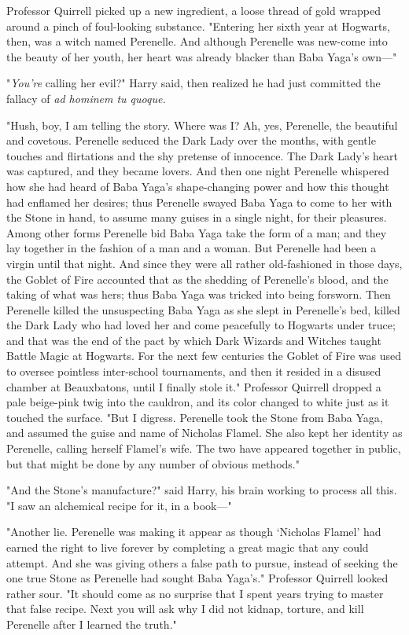 Professor Quirrell picked up a new ingredient, a loose thread of gold wrapped
around a pinch of foul-looking substance. "Entering her sixth year at Hogwarts,
then, was a witch named Perenelle. And although Perenelle was new-come into the
beauty of her youth, her heart was already blacker than Baba Yaga's own---"

"\emph{You're} calling her evil?" Harry said, then realized he had just
committed the fallacy of \emph{ad hominem tu quoque.}

"Hush, boy, I am telling the story. Where was I? Ah, yes, Perenelle, the
beautiful and covetous. Perenelle seduced the Dark Lady over the months, with
gentle touches and flirtations and the shy pretense of innocence. The Dark
Lady's heart was captured, and they became lovers. And then one night Perenelle
whispered how she had heard of Baba Yaga's shape-changing power and how this
thought had enflamed her desires; thus Perenelle swayed Baba Yaga to come to
her with the Stone in hand, to assume many guises in a single night, for their
pleasures. Among other forms Perenelle bid Baba Yaga take the form of a man;
and they lay together in the fashion of a man and a woman. But Perenelle had
been a virgin until that night. And since they were all rather old-fashioned in
those days, the Goblet of Fire accounted that as the shedding of Perenelle's
blood, and the taking of what was hers; thus Baba Yaga was tricked into being
forsworn. Then Perenelle killed the unsuspecting Baba Yaga as she slept in
Perenelle's bed, killed the Dark Lady who had loved her and come peacefully to
Hogwarts under truce; and that was the end of the pact by which Dark Wizards
and Witches taught Battle Magic at Hogwarts. For the next few centuries the
Goblet of Fire was used to oversee pointless inter-school tournaments, and then
it resided in a disused chamber at Beauxbatons, until I finally stole it."
Professor Quirrell dropped a pale beige-pink twig into the cauldron, and its
color changed to white just as it touched the surface. "But I digress.
Perenelle took the Stone from Baba Yaga, and assumed the guise and name of
Nicholas Flamel. She also kept her identity as Perenelle, calling herself
Flamel's wife. The two have appeared together in public, but that might be done
by any number of obvious methods."

"And the Stone's manufacture?" said Harry, his brain working to process all
this. "I saw an alchemical recipe for it, in a book---"

"Another lie. Perenelle was making it appear as though `Nicholas Flamel' had
earned the right to live forever by completing a great magic that any could
attempt. And she was giving others a false path to pursue, instead of seeking
the one true Stone as Perenelle had sought Baba Yaga's." Professor Quirrell
looked rather sour. "It should come as no surprise that I spent years trying to
master that false recipe. Next you will ask why I did not kidnap, torture, and
kill Perenelle after I learned the truth."

